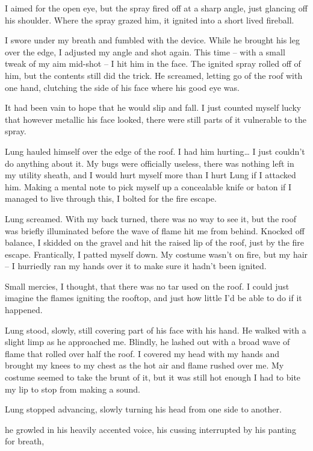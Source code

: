 I aimed for the open eye, but the spray fired off at a sharp angle, just glancing off his shoulder. Where the spray grazed him, it ignited into a short lived fireball.

I swore under my breath and fumbled with the device. While he brought his leg over the edge, I adjusted my angle and shot again. This time -- with a small tweak of my aim mid-shot -- I hit him in the face. The ignited spray rolled off of him, but the contents still did the trick. He screamed, letting go of the roof with one hand, clutching the side of his face where his good eye was.

It had been vain to hope that he would slip and fall. I just counted myself lucky that however metallic his face looked, there were still parts of it vulnerable to the spray.

Lung hauled himself over the edge of the roof. I had him hurting\ldots{} I just couldn't do anything about it. My bugs were officially useless, there was nothing left in my utility sheath, and I would hurt myself more than I hurt Lung if I attacked him. Making a mental note to pick myself up a concealable knife or baton if I managed to live through this, I bolted for the fire escape.

 Lung screamed. With my back turned, there was no way to see it, but the roof was briefly illuminated before the wave of flame hit me from behind. Knocked off balance, I skidded on the gravel and hit the raised lip of the roof, just by the fire escape. Frantically, I patted myself down. My costume wasn't on fire, but my hair -- I hurriedly ran my hands over it to make sure it hadn't been ignited.

Small mercies, I thought, that there was no tar used on the roof. I could just imagine the flames igniting the rooftop, and just how little I'd be able to do if it happened.

Lung stood, slowly, still covering part of his face with his hand. He walked with a slight limp as he approached me. Blindly, he lashed out with a broad wave of flame that rolled over half the roof. I covered my head with my hands and brought my knees to my chest as the hot air and flame rushed over me. My costume seemed to take the brunt of it, but it was still hot enough I had to bite my lip to stop from making a sound.

Lung stopped advancing, slowly turning his head from one side to another.

 he growled in his heavily accented voice, his cussing interrupted by his panting for breath, 

